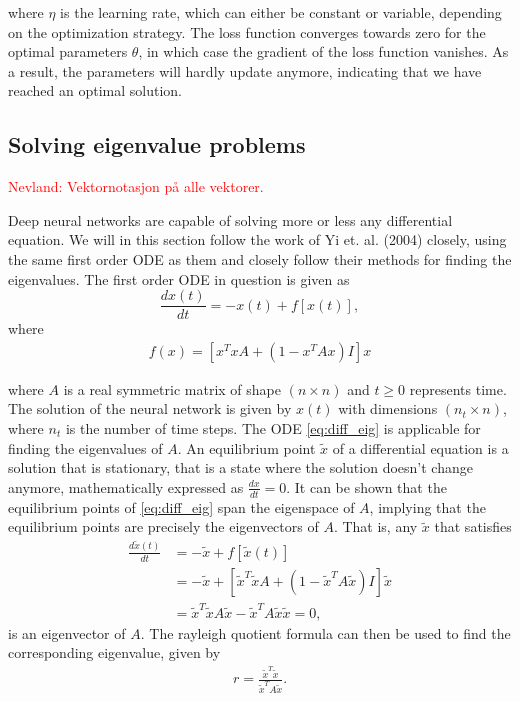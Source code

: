 \documentclass[12pt]{extarticle}
\begin{document}
where $\eta$ is the learning rate, which can either be constant or variable, depending on the optimization strategy.
The loss function converges towards zero for the optimal parameters $\theta$, in which case the gradient of the loss function vanishes. As a result, the parameters will hardly update anymore, indicating that we have reached an optimal solution.


\subsection{Solving eigenvalue problems}
\textcolor{red}{Nevland: Vektornotasjon på alle vektorer.}

Deep neural networks are capable of solving more or less any differential equation. We will in this section follow the work of Yi et. al. (2004) \cite{yi2004neural} closely, using the same first order ODE as them and closely follow their methods for finding the eigenvalues. The first order ODE in question is given as     
\begin{equation}
	\frac{dx(t)}{dt} = -x(t) + f[x(t)],
	\label{eq:diff_eig}
\end{equation}
where
\begin{align}
	f(x) = [x^TxA + (1 - x^TAx)I]x
\end{align}

where $A$ is a real symmetric matrix of shape $(n\times n)$ and $t \ge 0$ represents time. The solution of the neural network is given by $x(t)$ with dimensions $(n_t\times n)$, where $n_t$ is the number of time steps. The ODE \eqref{eq:diff_eig} is applicable for finding the eigenvalues of $A$. An equilibrium point $\tilde{x}$ of a differential equation is a solution that is stationary, that is a state where the solution doesn't change anymore, mathematically expressed as $\frac{dx}{dt} = 0$. It can be shown that the equilibrium points of \eqref{eq:diff_eig} span the eigenspace of $A$, implying that the equilibrium points are precisely the eigenvectors of $A$. That is, any $\tilde{x}$ that satisfies
\begin{align}
	\frac{d\tilde{x}(t)}{dt} &= -\tilde{x} + f[\tilde{x}(t)] \nonumber \\
	&= -\tilde{x} + [\tilde{x}^T\tilde{x}A + (1 - \tilde{x}^TA\tilde{x})I]\tilde{x} \nonumber \\
	&= \tilde{x}^T\tilde{x}A\tilde{x} - \tilde{x}^TA\tilde{x}\tilde{x} = 0,
\end{align}
is an eigenvector of $A$. The rayleigh quotient formula can then be used to find the corresponding eigenvalue, given by
\begin{align} \label{eq:rayleigh_quotient}
	r = \frac{\tilde{x}^T\tilde{x}}{\tilde{x}^T A \tilde{x}}.
\end{align}
\end{document}
